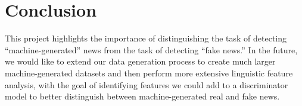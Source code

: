 \documentclass[11pt,a4paper]{article}
\begin{document}
\section{Conclusion}
This project highlights the importance of distinguishing the task of detecting ``machine-generated'' news from the task of detecting ``fake news.'' In the future, we would like to extend our data generation process to create much larger machine-generated datasets and then perform more extensive linguistic feature analysis, with the goal of identifying features we could add to a discriminator model to better distinguish between machine-generated real and fake news.



\end{document}
